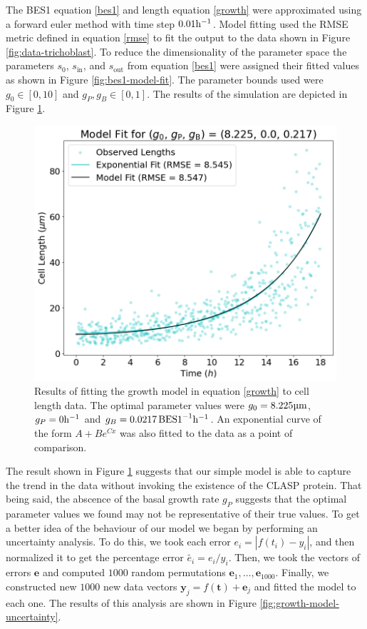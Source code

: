 \medskip

The BES1 equation \eqref{bes1} and length equation \eqref{growth} were approximated using a forward euler method with time step $0.01\ph$. Model fitting used the RMSE metric defined in equation \eqref{rmse} to fit the output to the data shown in Figure \ref{fig:data-trichoblast}. To reduce the dimensionality of the parameter space the parameters $s_{0}$, $s_{\text{in}}$, and $s_{\text{out}}$ from equation \eqref{bes1} were assigned their fitted values as shown in Figure \ref{fig:bes1-model-fit}. The parameter bounds used were $g_{0} \in [0, 10]$ and $g_{P}, g_{B} \in [0, 1]$. The results of the simulation are depicted in Figure \ref{fig:growth-model-fit}.

\begin{figure}[!hbt]
    \centering
    \includegraphics[width=13cm]{img/growth-model-fit.png}
    \caption{Results of fitting the growth model in equation \eqref{growth} to cell length data. The optimal parameter values were $g_{0} = 8.225\um$, $g_{P} = 0 \ph$ and $g_{B} = 0.0217\,\text{BES1}^{-1}\ph$. An exponential curve of the form $A + Be^{Cx}$ was also fitted to the data as a point of comparison. }
    \label{fig:growth-model-fit}
\end{figure}

\medskip

The result shown in Figure \ref{fig:growth-model-fit} suggests that our simple model is able to capture the trend in the data without invoking the existence of the CLASP protein. That being said, the abscence of the basal growth rate $g_{P}$ suggests that the optimal parameter values we found may not be representative of their true values. To get a better idea of the behaviour of our model we began by performing an uncertainty analysis. To do this, we  took each error $e_{i} = |f(t_{i}) - y_{i}|$, and then normalized it to get  the percentage error $\tilde{e_{i}} = e_{i} / y_{i}$. Then, we took the vectors of errors $\mathbf{e}$ and computed $1000$ random permutations $\mathbf{e}_{1}, \dots, \mathbf{e}_{1000}$. Finally, we constructed new $1000$ new data vectors $\mathbf{y}_{j} = f(\mathbf{t}) + \mathbf{e}_{j}$ and fitted the model to each one. The results of this analysis are shown in Figure \ref{fig:growth-model-uncertainty}.

